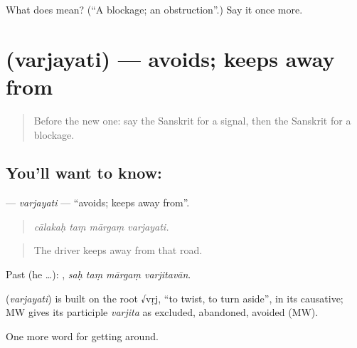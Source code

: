 \begin{tcolorbox}[breakable,colback=teal!4,colframe=teal!35!black,title={Before you move on}]
What does  mean? (\textquotedblleft{}A blockage; an obstruction\textquotedblright{}.) Say it once more.
\end{tcolorbox}
\section[\texorpdfstring{\sk{वर्जयति} (varjayati)}{वर्जयति (varjayati)}]{ (varjayati) — avoids; keeps away from}

\label{lesson:SA-C411-varjayati}



\begin{quote}
Before the new one: say the Sanskrit for a signal, then the Sanskrit for a blockage.
\end{quote}

\subsection*{You'll want to know: }
\textbf{} — \emph{varjayati} — \textquotedblleft{}avoids; keeps away from\textquotedblright{}.

\begin{quote}
   
\end{quote}

\begin{quote}
\emph{cālakaḥ taṃ mārgaṃ varjayati.}
\end{quote}

\begin{quote}
The driver keeps away from that road.
\end{quote}

Past (he …):    , \emph{saḥ taṃ mārgaṃ varjitavān}.

\begin{cousinweb}
\textbf{} (\emph{varjayati}) is built on the root √vṛj, \textquotedblleft{}to twist, to turn aside\textquotedblright{}, in its causative; MW gives its participle \emph{varjita} as excluded, abandoned, avoided (MW).
\end{cousinweb}

\begin{grammarlens}[title={What you've built}]
One more word for getting around.
\end{grammarlens}

